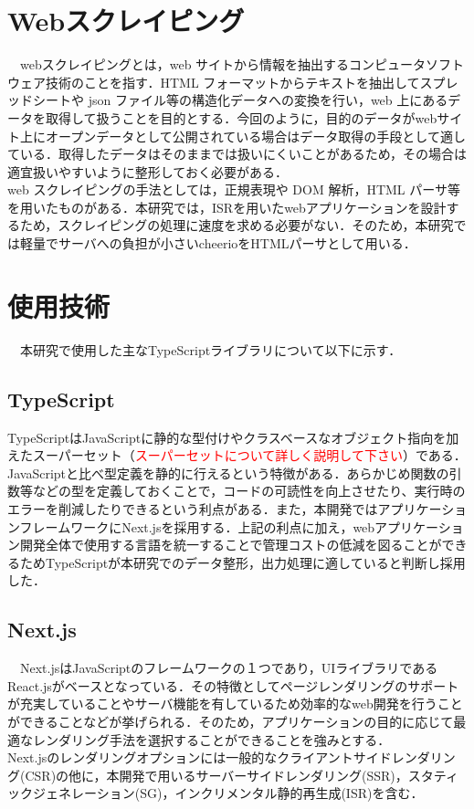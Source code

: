 \section{Webスクレイピング}

　webスクレイピングとは，web サイトから情報を抽出するコンピュータソフトウェア技術のことを指す．HTML フォーマットからテキストを抽出してスプレッドシートや json ファイル等の構造化データへの変換を行い，web 上にあるデータを取得して扱うことを目的とする．今回のように，目的のデータがwebサイト上にオープンデータとして公開されている場合はデータ取得の手段として適している．取得したデータはそのままでは扱いにくいことがあるため，その場合は適宜扱いやすいように整形しておく必要がある．
 \\web スクレイピングの手法としては，正規表現や DOM 解析，HTML パーサ等を用いたものがある．本研究では，ISRを用いたwebアプリケーションを設計するため，スクレイピングの処理に速度を求める必要がない．そのため，本研究では軽量でサーバへの負担が小さいcheerioをHTMLパーサとして用いる．
 
\section{使用技術}
　本研究で使用した主なTypeScriptライブラリについて以下に示す．
 
 \subsection{TypeScript}
 TypeScriptはJavaScriptに静的な型付けやクラスベースなオブジェクト指向を加えたスーパーセット（\textcolor{red}{スーパーセットについて詳しく説明して下さい}）である．JavaScriptと比べ型定義を静的に行えるという特徴がある．あらかじめ関数の引数等などの型を定義しておくことで，コードの可読性を向上させたり、実行時のエラーを削減したりできるという利点がある．また，本開発ではアプリケーションフレームワークにNext.jsを採用する．上記の利点に加え，webアプリケーション開発全体で使用する言語を統一することで管理コストの低減を図ることができるためTypeScriptが本研究でのデータ整形，出力処理に適していると判断し採用した．

\subsection{Next.js}
　Next.jsはJavaScriptのフレームワークの１つであり，UIライブラリであるReact.jsがベースとなっている．その特徴としてページレンダリングのサポートが充実していることやサーバ機能を有しているため効率的なweb開発を行うことができることなどが挙げられる．そのため，アプリケーションの目的に応じて最適なレンダリング手法を選択することができることを強みとする．\\
 Next.jsのレンダリングオプションには一般的なクライアントサイドレンダリング(CSR)の他に，本開発で用いるサーバーサイドレンダリング(SSR)，スタティックジェネレーション(SG)，インクリメンタル静的再生成(ISR)を含む．

